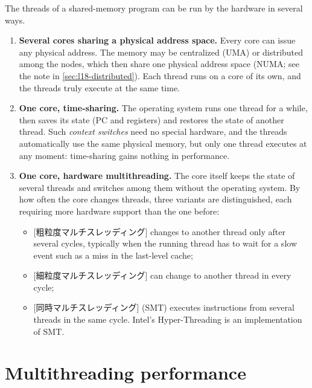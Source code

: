 \documentclass[../main.tex]{subfiles}
\begin{document}
The threads of a shared-memory program can be run by the hardware in
several ways.
\begin{enumerate}
  \item \textbf{Several cores sharing a physical address space.}  Every core
    can issue any physical address.  The memory may be centralized (UMA) or
    distributed among the nodes, which then share one physical address space
    (NUMA; see the note in \cref{sec:l18-distributed}).  Each thread runs on a
    core of its own, and the threads truly execute at the same time.
  \item \textbf{One core, time-sharing.}  The operating system runs one
    thread for a while, then saves its state (PC and registers) and restores
    the state of another thread.  Such \emph{context switches} need no
    special hardware, and the threads automatically use the same physical
    memory, but only one thread executes at any moment: time-sharing gains
    nothing in performance.
  \item \textbf{One core, hardware multithreading.}  The core itself keeps
    the state of several threads and switches among them without the
    operating system.  By how often the core changes threads, three
    variants are distinguished, each requiring more hardware support than
    the one before:
    \begin{itemize}
      \item {}[粗粒度マルチスレッディング]
        changes to another thread only after several cycles, typically when
        the running thread has to wait for a slow event such as a miss in
        the last-level cache;
      \item {}[細粒度マルチスレッディング]
        can change to another thread in every cycle;
      \item {}[同時マルチスレッディング]%
         (SMT) executes
        instructions from several threads in the same cycle.  Intel's
        Hyper-Threading is an implementation of SMT.
    \end{itemize}
\end{enumerate}

\section{Multithreading performance}
\label{sec:l18-mt-performance}
\end{document}
